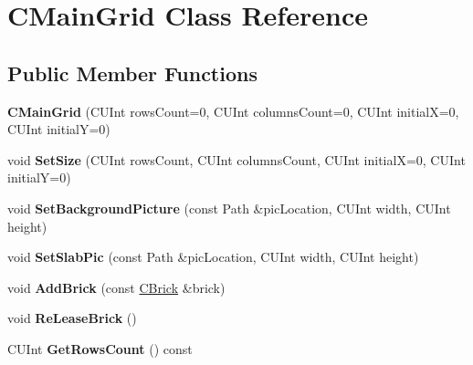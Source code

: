 \hypertarget{classCMainGrid}{\section{C\-Main\-Grid Class Reference}
\label{classCMainGrid}
}
\subsection*{Public Member Functions}
\begin{DoxyCompactItemize}
\item 
\hypertarget{classCMainGrid_a4cb57aa0aa8b37a466c5ad502dc04cb3}{{\bfseries C\-Main\-Grid} (C\-U\-Int rows\-Count=0, C\-U\-Int columns\-Count=0, C\-U\-Int initial\-X=0, C\-U\-Int initial\-Y=0)}\label{classCMainGrid_a4cb57aa0aa8b37a466c5ad502dc04cb3}

\item 
\hypertarget{classCMainGrid_a9051dc8159c06990b157238420e5c44a}{void {\bfseries Set\-Size} (C\-U\-Int rows\-Count, C\-U\-Int columns\-Count, C\-U\-Int initial\-X=0, C\-U\-Int initial\-Y=0)}\label{classCMainGrid_a9051dc8159c06990b157238420e5c44a}

\item 
\hypertarget{classCMainGrid_ad790fd79331041f0c82e3684bdd366d6}{void {\bfseries Set\-Background\-Picture} (const Path \&pic\-Location, C\-U\-Int width, C\-U\-Int height)}\label{classCMainGrid_ad790fd79331041f0c82e3684bdd366d6}

\item 
\hypertarget{classCMainGrid_a3d699794980df4ed55741802a5e6f99b}{void {\bfseries Set\-Slab\-Pic} (const Path \&pic\-Location, C\-U\-Int width, C\-U\-Int height)}\label{classCMainGrid_a3d699794980df4ed55741802a5e6f99b}

\item 
\hypertarget{classCMainGrid_a4a6c52b72b7bdffeb2c8501e17eef749}{void {\bfseries Add\-Brick} (const \hyperlink{classCBrick}{C\-Brick} \&brick)}\label{classCMainGrid_a4a6c52b72b7bdffeb2c8501e17eef749}

\item 
\hypertarget{classCMainGrid_a88ebd799daac44ebc6c6732d20423d15}{void {\bfseries Re\-Lease\-Brick} ()}\label{classCMainGrid_a88ebd799daac44ebc6c6732d20423d15}

\item 
\hypertarget{classCMainGrid_a75a4406abd98db7135ad063b13f50ff0}{C\-U\-Int {\bfseries Get\-Rows\-Count} () const }\label{classCMainGrid_a75a4406abd98db7135ad063b13f50ff0}


\end{DoxyCompactItemize}
